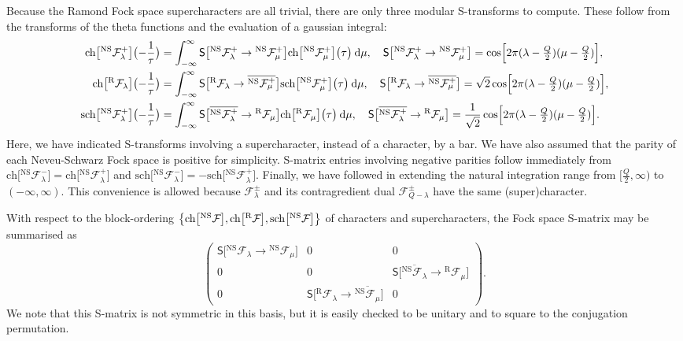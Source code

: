 \documentclass[a4paper,reqno,12pt]{report}
\theoremstyle{definition}
\numberwithin{equation}{section}
\let\originalleft\left     %
\let\originalright\right
\renewcommand{\left}{\mathopen{}\mathclose\bgroup\originalleft}
\renewcommand{\right}{\aftergroup\egroup\originalright}
\newcommand{\sqbrac}[1]{\left[ #1 \right]}
\newcommand{\set}[1]{\left\{ #1 \right\}}
\newcommand{\dd}{\mathrm{d}}   %
\newcommand{\ra}{\rightarrow}
\newcommand{\Fock}[1]{\mathcal{F}_{#1}}      %
\newcommand{\chmap}{\mathrm{ch}}
\newcommand{\schmap}{\mathrm{sch}}
\newcommand{\Gr}[1]{\bigl[ #1 \bigr]}            %
\newcommand{\ch}[1]{\chmap \Gr{#1}}              %
\newcommand{\fch}[2]{\ch{#1} \bigl( #2 \bigr)}   %
\newcommand{\sch}[1]{\schmap \Gr{#1}}              %
\newcommand{\fsch}[2]{\sch{#1} \bigl( #2 \bigr)}   %
\newcommand{\modS}{\mathsf{S}} %
\newcommand{\Smat}[2]{\modS \bigl[ #1 \ra #2 \bigr]}  %
\newcommand{\ns}{Neveu-Schwarz}
\newcommand{\ram}{Ramond}
\theoremstyle{plain}
\newcommand{\NSFock}[1]{{}^{\text{NS}}\Fock{#1}}   %
\newcommand{\RFock}[1]{{}^{\text{R}}\Fock{#1}}     %
\begin{document}
Because the \ram{} Fock space supercharacters are all trivial, there are only three modular S-transforms to compute.  These follow from the transforms of the theta functions and the evaluation of a gaussian integral:
\begin{equation} \label{eq:FockSMat}
\begin{aligned}
\fch{\NSFock{\lambda}^+}{-\frac{1}{\tau}} &= \int_{-\infty}^{\infty} \Smat{\NSFock{\lambda}^+}{\NSFock{\mu}^+} \fch{\NSFock{\mu}^+}{\tau} \: \dd \mu, \quad \Smat{\NSFock{\lambda}^+}{\NSFock{\mu}^+} = \cos \sqbrac{2 \pi (\lambda - \tfrac{Q}{2}) (\mu - \tfrac{Q}{2})},\\
%
\fch{\RFock{\lambda}}{-\frac{1}{\tau}} &= \int_{-\infty}^{\infty} \Smat{\RFock{\lambda}}{\overline{\NSFock{\mu}^+}} \fsch{\NSFock{\mu}^+}{\tau} \: \dd \mu, \quad \Smat{\RFock{\lambda}}{\overline{\NSFock{\mu}^+}} = \sqrt{2} \cos \sqbrac{2 \pi (\lambda - \tfrac{Q}{2}) (\mu - \tfrac{Q}{2})},\\
%
\fsch{\NSFock{\lambda}^+}{-\frac{1}{\tau}} &= \int_{-\infty}^{\infty} \Smat{\overline{\NSFock{\lambda}^+}}{\RFock{\mu}} \fch{\RFock{\mu}}{\tau} \: \dd \mu, \quad \Smat{\overline{\NSFock{\lambda}^+}}{\RFock{\mu}} = \frac{1}{\sqrt{2}} \cos \sqbrac{2 \pi (\lambda - \tfrac{Q}{2}) (\mu - \tfrac{Q}{2})}.
\end{aligned}
\end{equation}
%
Here, we have indicated S-transforms involving a supercharacter, instead of a character, by a bar.  We have also assumed that the parity of each \ns{} Fock space is positive for simplicity.  S-matrix entries involving negative parities follow immediately from $\ch{\NSFock{\lambda}^-} = \ch{\NSFock{\lambda}^+}$ and $\sch{\NSFock{\lambda}^-} = -\sch{\NSFock{\lambda}^+}$.  Finally, we have followed \cite{CanFusI15} in extending the natural integration range from $[\frac{Q}{2}, \infty)$ to $(-\infty,\infty)$.  This convenience is allowed because $\Fock{\lambda}^{\pm}$ and its contragredient dual $\Fock{Q-\lambda}^{\pm}$ have the same (super)character.

With respect to the block-ordering $\set{\ch{\NSFock{}}, \ch{\RFock{}}, \sch{\NSFock{}}}$ of characters and supercharacters, the Fock space S-matrix may be summarised as
\begin{equation}
\begin{pmatrix}
\Smat{\NSFock{\lambda}}{\NSFock{\mu}} & 0 & 0 \\
0 & 0 & \Smat{\overline{\NSFock{\lambda}}}{\RFock{\mu}} \\
0 &\Smat{\RFock{\lambda}}{\overline{\NSFock{\mu}}} & 0
\end{pmatrix}
.
\end{equation}
We note that this S-matrix is not symmetric in this basis, but it is easily checked to be unitary and to square to the conjugation permutation.
\end{document}
